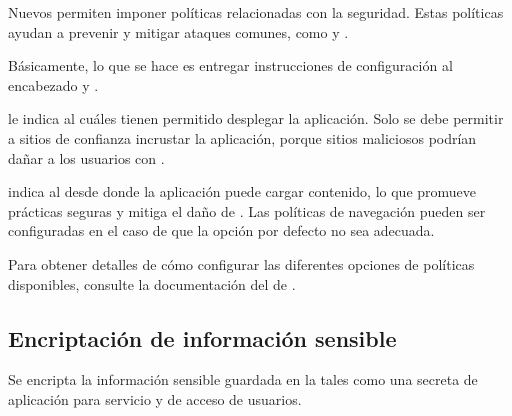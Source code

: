 Nuevos \browsersINT permiten imponer políticas relacionadas con la seguridad. Estas políticas ayudan a prevenir y mitigar ataques comunes, como \crossSiteScriptingINT y  \clickjackingINT.

Básicamente, lo que se hace es entregar instrucciones de configuración al encabezado \httpNAME \httpHeaderXFMINT y \httpHeaderCSPINT.

\httpHeaderXFMINT le indica al \browserINT cuáles \websitesINT tienen permitido desplegar la aplicación. Solo se debe permitir a sitios de confianza incrustar la aplicación, porque sitios maliciosos podrían dañar a los usuarios con \clickjackingINT \cite{online_javascript_info_clickjacking_frame_options}.




\httpHeaderCSPINT  indica al \browserINT desde donde la aplicación puede cargar contenido, lo que promueve prácticas seguras y mitiga el daño de \crossSiteScriptingINT \cite{online_html5rocks_CSP_introduction}. Las políticas de navegación pueden ser configuradas en el caso de que la opción por defecto no sea adecuada.

Para obtener detalles de cómo configurar las diferentes opciones de políticas disponibles, consulte la documentación del \packageAS  de \meteorNAME \browserPolicyPackage.


\subsection{Encriptación de información sensible}
	Se encripta la información sensible guardada en la \dataBasesDB tales como una \keyCPT secreta de aplicación para servicio \loginCPT y \tokensCPT de acceso de usuarios.




